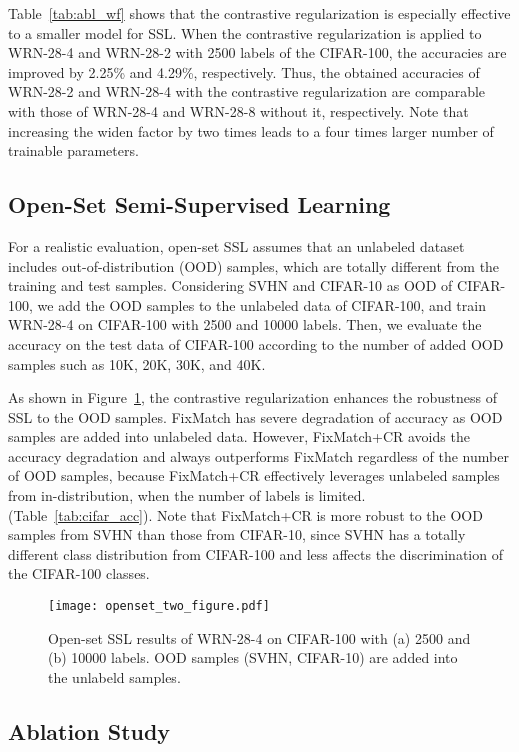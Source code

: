 \documentclass[letterpaper]{article} \usepackage{aaai22}  \usepackage{times}  \usepackage{helvet}  \usepackage{courier}  \usepackage[hyphens]{url}  \usepackage{graphicx} \urlstyle{rm} \def\UrlFont{\rm}  \usepackage{natbib}  \usepackage{caption} \DeclareCaptionStyle{ruled}{labelfont=normalfont,labelsep=colon,strut=off} \frenchspacing  \setlength{\pdfpagewidth}{8.5in}  \setlength{\pdfpageheight}{11in}  \usepackage{algorithm}
\begin{document}
Table~\ref{tab:abl_wf} shows that the contrastive regularization is especially effective to a smaller model for SSL.
When the contrastive regularization is applied to WRN-28-4 and WRN-28-2 with 2500 labels of the CIFAR-100, the accuracies are improved by 2.25\% and 4.29\%, respectively.
Thus, the obtained accuracies of WRN-28-2 and WRN-28-4 with the contrastive regularization are comparable with those of WRN-28-4 and WRN-28-8 without it, respectively.
Note that increasing the widen factor by two times leads to a four times larger number of trainable parameters.

\subsection{Open-Set Semi-Supervised Learning}
For a realistic evaluation, open-set SSL \cite{oliver2018realistic,yu2020multi} assumes that an unlabeled dataset includes out-of-distribution (OOD) samples, which are totally different from the training and test samples.
Considering SVHN and CIFAR-10 as OOD of CIFAR-100, we add the OOD samples to the unlabeled data of CIFAR-100, and train WRN-28-4 on CIFAR-100 with 2500 and 10000 labels. Then, we evaluate the accuracy on the test data of CIFAR-100 according to the number of added OOD samples such as 10K, 20K, 30K, and 40K.

As shown in Figure~\ref{fig:opensetSSL}, the contrastive regularization enhances the robustness of SSL to the OOD samples.
FixMatch has severe degradation of accuracy as OOD samples are added into unlabeled data.
However, FixMatch+CR avoids the accuracy degradation and always outperforms FixMatch regardless of the number of OOD samples, because FixMatch+CR effectively leverages unlabeled samples from in-distribution, when the number of labels is limited. (Table~\ref{tab:cifar_acc}).
Note that FixMatch+CR is more robust to the OOD samples from SVHN than those from CIFAR-10, since SVHN has a totally different class distribution from CIFAR-100 and less affects the discrimination of the CIFAR-100 classes.

\begin{figure}
\centering
\texttt{[image: openset\_two\_figure.pdf]}
\caption{Open-set SSL results of WRN-28-4 on CIFAR-100 with (a) 2500 and (b) 10000 labels. OOD samples (SVHN, CIFAR-10) are added into the unlabeld samples.}
\label{fig:opensetSSL}
\vspace{-0.125in}
\end{figure}


\subsection{Ablation Study}
\end{document}
